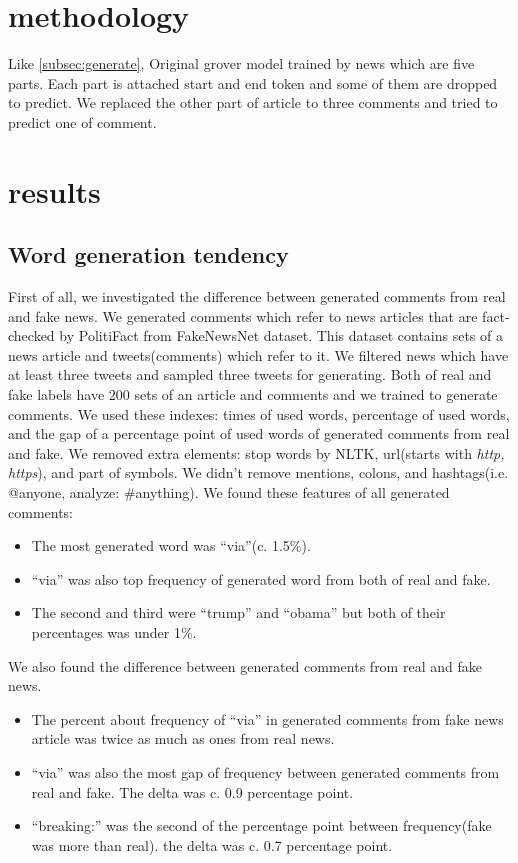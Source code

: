 \documentclass[conference]{IEEEtran}
\begin{document}
\section{methodology}
Like \ref{subsec:generate}, Original grover model trained by news which are five parts.
Each part is attached start and end token and some of them are dropped to predict.
We replaced the other part of article to three comments and tried to predict one of comment.
\section{results}
\subsection{Word generation tendency}
\label{subsec:trend}
First of all, we investigated the difference between generated comments from real and fake news.
We generated comments which refer to news articles that are fact-checked by PolitiFact from FakeNewsNet dataset\cite{Shu2018FakeNewsNetAD}.
This dataset contains sets of a news article and tweets(comments) which refer to it.
We filtered news which have at least three tweets and sampled three tweets for generating.
Both of real and fake labels have 200 sets of an article and comments and we trained to generate comments. 
We used these indexes: times of used words, percentage of used words, and the gap of a percentage point of used words of generated comments from real and fake.
We removed extra elements: stop words by NLTK, url(starts with \textit{http, https}), and part of symbols.
We didn't remove mentions, colons, and hashtags(i.e. @anyone, analyze: \#anything).
We found these features of all generated comments:
\begin{itemize}[]
    \item The most generated word was ``via''(c. 1.5\%).  
    \item ``via'' was also top frequency of generated word from both of real and fake. 
    \item The second and third were ``trump'' and ``obama'' but both of their percentages was under 1\%.
\end{itemize}
We also found the difference between generated comments from real and fake news.
\begin{itemize}[]
    \item The percent about frequency of ``via'' in generated comments from fake news article was twice as much as ones from real news.
    \item ``via'' was also the most gap of frequency between generated comments from real and fake.  The delta was c. 0.9 percentage point.
    \item ``breaking:'' was the second of the percentage point between frequency(fake was more than real). the delta was c. 0.7 percentage point.
\end{itemize}
\end{document}
